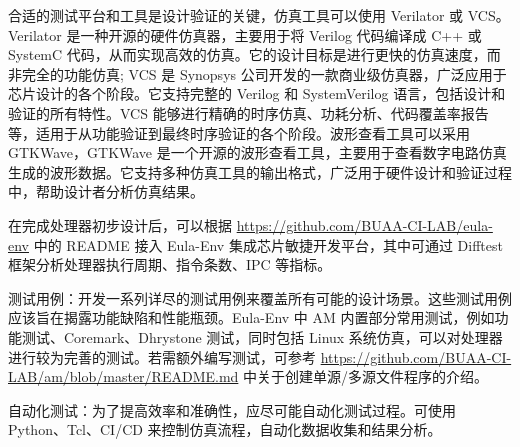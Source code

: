 合适的测试平台和工具是设计验证的关键，仿真工具可以使用 Verilator 或 VCS。Verilator 是一种开源的硬件仿真器，主要用于将 Verilog 代码编译成 C++ 或 SystemC 代码，从而实现高效的仿真。它的设计目标是进行更快的仿真速度，而非完全的功能仿真; VCS 是 Synopsys 公司开发的一款商业级仿真器，广泛应用于芯片设计的各个阶段。它支持完整的 Verilog 和 SystemVerilog 语言，包括设计和验证的所有特性。VCS 能够进行精确的时序仿真、功耗分析、代码覆盖率报告等，适用于从功能验证到最终时序验证的各个阶段。波形查看工具可以采用 GTKWave，GTKWave 是一个开源的波形查看工具，主要用于查看数字电路仿真生成的波形数据。它支持多种仿真工具的输出格式，广泛用于硬件设计和验证过程中，帮助设计者分析仿真结果。

在完成处理器初步设计后，可以根据 \url{https://github.com/BUAA-CI-LAB/eula-env} 中的 README 接入 Eula-Env 集成芯片敏捷开发平台，其中可通过 Difftest 框架分析处理器执行周期、指令条数、IPC 等指标。

测试用例：开发一系列详尽的测试用例来覆盖所有可能的设计场景。这些测试用例应该旨在揭露功能缺陷和性能瓶颈。Eula-Env 中 AM 内置部分常用测试，例如功能测试、Coremark、Dhrystone 测试，同时包括 Linux 系统仿真，可以对处理器进行较为完善的测试。若需额外编写测试，可参考 \url{https://github.com/BUAA-CI-LAB/am/blob/master/README.md} 中关于创建单源/多源文件程序的介绍。

自动化测试：为了提高效率和准确性，应尽可能自动化测试过程。可使用 Python、Tcl、CI/CD 来控制仿真流程，自动化数据收集和结果分析。
